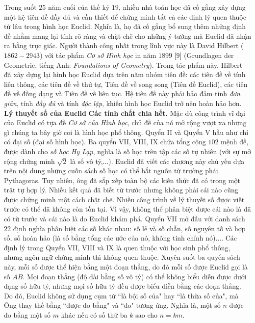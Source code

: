 \begin{multicols}{2}
	\vskip 0.1cm
	Trong suốt $25$ năm cuối của thế kỷ $19$, nhiều nhà toán học đã cố gắng xây dựng một hệ tiên đề đầy đủ và cần thiết để chứng minh tất cả các định lý quen thuộc từ lâu trong hình học Euclid. Nghĩa là, họ đã cố gắng bổ sung thêm những định đề nhằm mang lại tính rõ ràng và chặt chẽ cho những ý tưởng mà Euclid đã nhận ra bằng trực giác.  Người thành công nhất trong lĩnh vực này là David Hilbert ($1862-2943$) với tác phẩm \textit{Cơ sở Hình học} in năm $1899$ [$9$] (Grundlagen der Geometrie, tiếng Anh: \textit{Foundations of Geometry}). Trong tác phẩm này, Hilbert đã xây dựng lại hình học Euclid dựa trên năm nhóm tiên đề: các tiên đề về tính liên thông, các tiên đề về thứ tự, Tiên đề về song song (Tiên đề Euclid), các tiên đề về đồng dạng và Tiên đề về liên tục.  Hệ tiên đề này phải bảo đảm tính \textit{đơn giản}, tính \textit{đầy đủ} và tính \textit{độc lập}, khiến hình học Euclid trở nên hoàn hảo hơn.  
	\vskip 0.1cm
	\textbf{\color{lichsutoanhoc}Lý thuyết số của Euclid}
	\vskip 0.1cm
	\textbf{\color{lichsutoanhoc}Các tính chất chia hết.} Mặc dù công trình vĩ đại của Euclid có tựa đề \textit{Cơ sở của Hình học}, chủ đề của nó mở rộng vượt xa những gì chúng ta bây giờ coi là hình học phổ thông. Quyển II và Quyển V hầu như chỉ có đại số (đại số hình học). Ba quyển VII, VIII, IX chứa tổng cộng $102$ mệnh đề, được dành cho \textit{số học Hy Lạp}, nghĩa là số học trên tập các số tự nhiên (với sự mở rộng chứng minh $\sqrt{2}$ là số vô tỷ,...). Euclid đã viết các chương này chủ yếu dựa trên nội dung những cuốn sách số học có thể bắt nguồn từ trường phái Pythagoras. Tuy nhiên, ông đã sắp xếp toàn bộ các kiến thức đã có trong một trật tự hợp lý. Nhiều kết quả đã biết từ trước nhưng không phải cái nào cũng được chứng minh một cách chặt chẽ. Nhiều công trình về lý thuyết số được viết trước có thể đã không còn tồn tại. Vì vậy, không thể phân biệt được cái nào là đã có từ trước và cái nào là do Euclid khám phá. 
	\vskip 0.1cm
	Quyển VII mở đầu với danh sách $22$ định nghĩa phân biệt các số khác nhau: số lẻ và số chẵn, số nguyên tố và hợp số, số hoàn hảo (là số bằng tổng các ước của nó, không tính chính nó).... Các định lý trong Quyển VII, VIII và IX là quen thuộc với học sinh phổ thông, nhưng ngôn ngữ chứng minh thì không quen thuộc. Xuyên suốt ba quyển sách này, mỗi số được thể hiện bằng một đoạn thẳng, do đó mỗi số được Euclid gọi là số $AB$. Mọi đoạn thẳng (độ dài bằng số vô tỷ) có thể không biểu diễn được dưới dạng số hữu tỷ, nhưng mọi số hữu tỷ đều được biểu diễn bằng các đoạn thẳng.
	\vskip 0.1cm
	Do đó, Euclid không sử dụng cụm từ ``là bội số của" hay ``là thừa số của", mà Ông thay thế bằng ``được đo bằng" và ``đo" tương ứng. Nghĩa là, một số $n$  được đo bằng một số $m$  khác nếu có số thứ ba $k$  sao cho  $n = km$.

\end{multicols}
